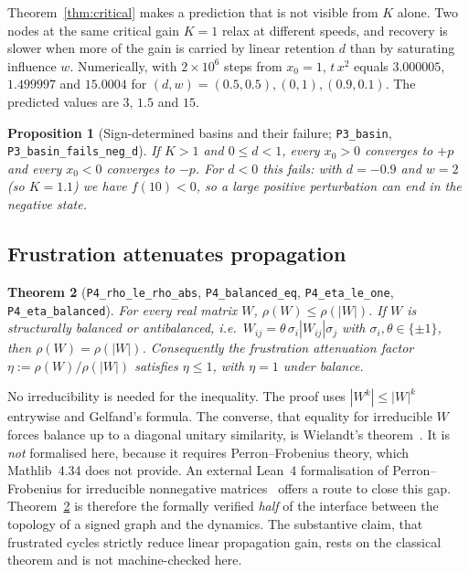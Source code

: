 \documentclass[11pt]{article}
\newtheorem{theorem}{Theorem}
\newtheorem{proposition}[theorem]{Proposition}
\theoremstyle{definition}
\theoremstyle{remark}
\newcommand{\lean}[1]{\texttt{\small #1}}
\begin{document}
Theorem~\ref{thm:critical} makes a prediction that is not visible from $K$ alone. Two nodes at the same
critical gain $K=1$ relax at different speeds, and recovery is slower when more of the gain is carried
by linear retention $d$ than by saturating influence $w$. Numerically, with $2\times10^6$ steps from
$x_0=1$, $t\,x^2$ equals $3.000005$, $1.499997$ and $15.0004$ for $(d,w)=(0.5,0.5),(0,1),(0.9,0.1)$. The
predicted values are $3$, $1.5$ and $15$.

\begin{proposition}[Sign-determined basins and their failure; \lean{P3\_basin}, \lean{P3\_basin\_fails\_neg\_d}]
If $K>1$ and $0\le d<1$, every $x_0>0$ converges to $+p$ and every $x_0<0$ converges to $-p$. For $d<0$ this
fails: with $d=-0.9$ and $w=2$ (so $K=1.1$) we have $f(10)<0$, so a large positive perturbation can
end in the negative state.
\end{proposition}

\subsection{Frustration attenuates propagation}

\begin{theorem}[\lean{P4\_rho\_le\_rho\_abs}, \lean{P4\_balanced\_eq}, \lean{P4\_eta\_le\_one}, \lean{P4\_eta\_balanced}]\label{thm:frustration}
For every real matrix $W$, $\rho(W)\le\rho(|W|)$. If $W$ is structurally balanced or antibalanced,
i.e.\ $W_{ij}=\theta\,\sigma_i|W_{ij}|\sigma_j$ with $\sigma_i,\theta\in\{\pm1\}$, then
$\rho(W)=\rho(|W|)$. Consequently the frustration attenuation factor
$\eta:=\rho(W)/\rho(|W|)$ satisfies $\eta\le1$, with $\eta=1$ under balance.
\end{theorem}

No irreducibility is needed for the inequality. The proof uses $|W^k|\le|W|^k$ entrywise and Gelfand's
formula. The converse, that equality for irreducible $W$ forces balance up to a diagonal unitary
similarity, is Wielandt's theorem~\cite{wielandt1950}. It is \emph{not} formalised here, because it requires
Perron--Frobenius theory, which Mathlib~4.34 does not provide. An external Lean~4 formalisation of
Perron--Frobenius for irreducible nonnegative matrices~\cite{cipollina2025} offers a route to close this
gap. Theorem~\ref{thm:frustration} is therefore the formally verified \emph{half} of the interface between
the topology of a signed graph and the dynamics. The substantive claim, that frustrated cycles
strictly reduce linear propagation gain, rests on the classical theorem and is not machine-checked here.
\end{document}

